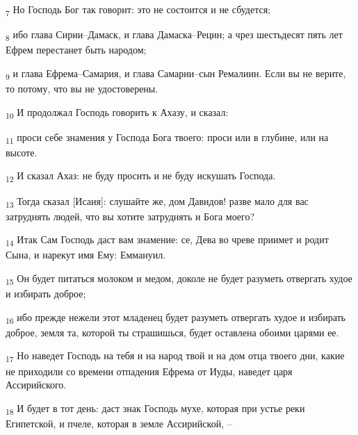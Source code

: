 \begin{tcolorbox}
\textsubscript{7} Но Господь Бог так говорит: это не состоится и не сбудется;
\end{tcolorbox}
\begin{tcolorbox}
\textsubscript{8} ибо глава Сирии--Дамаск, и глава Дамаска--Рецин; а чрез шестьдесят пять лет Ефрем перестанет быть народом;
\end{tcolorbox}
\begin{tcolorbox}
\textsubscript{9} и глава Ефрема--Самария, и глава Самарии--сын Ремалиин. Если вы не верите, то потому, что вы не удостоверены.
\end{tcolorbox}
\begin{tcolorbox}
\textsubscript{10} И продолжал Господь говорить к Ахазу, и сказал:
\end{tcolorbox}
\begin{tcolorbox}
\textsubscript{11} проси себе знамения у Господа Бога твоего: проси или в глубине, или на высоте.
\end{tcolorbox}
\begin{tcolorbox}
\textsubscript{12} И сказал Ахаз: не буду просить и не буду искушать Господа.
\end{tcolorbox}
\begin{tcolorbox}
\textsubscript{13} Тогда сказал [Исаия]: слушайте же, дом Давидов! разве мало для вас затруднять людей, что вы хотите затруднять и Бога моего?
\end{tcolorbox}
\begin{tcolorbox}
\textsubscript{14} Итак Сам Господь даст вам знамение: се, Дева во чреве приимет и родит Сына, и нарекут имя Ему: Еммануил.
\end{tcolorbox}
\begin{tcolorbox}
\textsubscript{15} Он будет питаться молоком и медом, доколе не будет разуметь отвергать худое и избирать доброе;
\end{tcolorbox}
\begin{tcolorbox}
\textsubscript{16} ибо прежде нежели этот младенец будет разуметь отвергать худое и избирать доброе, земля та, которой ты страшишься, будет оставлена обоими царями ее.
\end{tcolorbox}
\begin{tcolorbox}
\textsubscript{17} Но наведет Господь на тебя и на народ твой и на дом отца твоего дни, какие не приходили со времени отпадения Ефрема от Иуды, наведет царя Ассирийского.
\end{tcolorbox}
\begin{tcolorbox}
\textsubscript{18} И будет в тот день: даст знак Господь мухе, которая при устье реки Египетской, и пчеле, которая в земле Ассирийской, --
\end{tcolorbox}
